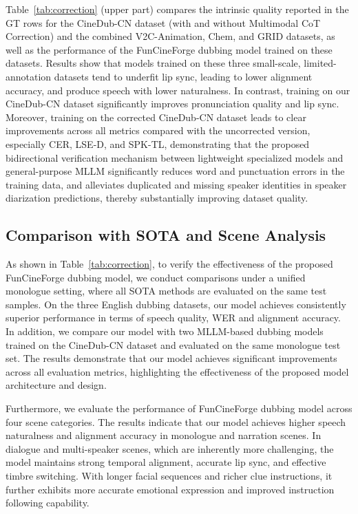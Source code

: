\documentclass{article}
\begin{document}
Table~\ref{tab:correction} (upper part) compares the intrinsic quality reported in the GT rows 
for the CineDub-CN dataset (with and without Multimodal CoT Correction) and the combined V2C-Animation, Chem, and GRID datasets,
as well as the performance of the FunCineForge dubbing model trained on these datasets.
Results show that models trained on these three small-scale, limited-annotation datasets 
tend to underfit lip sync, leading to lower alignment accuracy, and produce speech with lower naturalness.
In contrast, training on our CineDub-CN dataset
significantly improves pronunciation quality and lip sync.
Moreover, training on the corrected CineDub-CN dataset leads to clear improvements across all metrics 
compared with the uncorrected version, especially CER, LSE-D, and SPK-TL,
demonstrating that the proposed bidirectional verification mechanism 
between lightweight specialized models and general-purpose MLLM 
significantly reduces word and punctuation errors in the training data,
and alleviates duplicated and missing speaker identities in speaker diarization predictions, 
thereby substantially improving dataset quality.

\subsection{Comparison with SOTA and Scene Analysis}
As shown in Table~\ref{tab:correction}, to verify the effectiveness of the proposed FunCineForge dubbing model, 
we conduct comparisons under a unified monologue setting, where all SOTA methods are evaluated on the same test samples.
On the three English dubbing datasets, 
our model achieves consistently superior performance in terms of speech quality, WER and alignment accuracy.
In addition, we compare our model with two MLLM-based dubbing models trained on the CineDub-CN dataset
and evaluated on the same monologue test set.
The results demonstrate that our model achieves significant improvements across all evaluation metrics, 
highlighting the effectiveness of the proposed model architecture and design.

Furthermore, we evaluate the performance of FunCineForge dubbing model across four scene categories.
The results indicate that our model achieves higher speech naturalness and alignment accuracy in monologue and narration scenes.
In dialogue and multi-speaker scenes, which are inherently more challenging, 
the model maintains strong temporal alignment, accurate lip sync, and effective timbre switching.
With longer facial sequences and richer clue instructions, 
it further exhibits more accurate emotional expression and improved instruction following capability.
\end{document}
